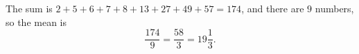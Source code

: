 The sum is $2+5+6+7+8+13+27+49+57=174$, and there are $9$ numbers, so the mean is
\[
\dfrac{174}{9}=\boxed{\dfrac{58}{3}}=19\dfrac{1}{3} .
\]

